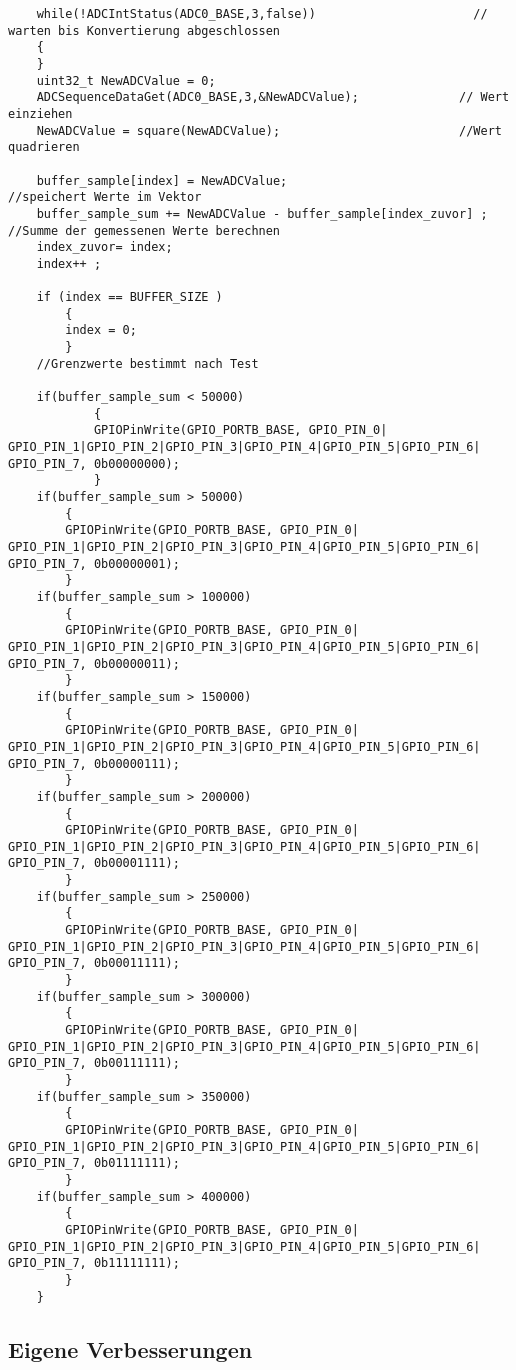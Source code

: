 \begin{lstlisting}
    while(!ADCIntStatus(ADC0_BASE,3,false))                      // warten bis Konvertierung abgeschlossen
    {
    }
    uint32_t NewADCValue = 0;
    ADCSequenceDataGet(ADC0_BASE,3,&NewADCValue);              // Wert einziehen
    NewADCValue = square(NewADCValue);                         //Wert quadrieren

    buffer_sample[index] = NewADCValue;                                 //speichert Werte im Vektor
    buffer_sample_sum += NewADCValue - buffer_sample[index_zuvor] ;     //Summe der gemessenen Werte berechnen
    index_zuvor= index;
    index++ ;

    if (index == BUFFER_SIZE )
        {
        index = 0;
        }
    //Grenzwerte bestimmt nach Test

    if(buffer_sample_sum < 50000)
            {
            GPIOPinWrite(GPIO_PORTB_BASE, GPIO_PIN_0| GPIO_PIN_1|GPIO_PIN_2|GPIO_PIN_3|GPIO_PIN_4|GPIO_PIN_5|GPIO_PIN_6| GPIO_PIN_7, 0b00000000);
            }
    if(buffer_sample_sum > 50000)
        {
        GPIOPinWrite(GPIO_PORTB_BASE, GPIO_PIN_0| GPIO_PIN_1|GPIO_PIN_2|GPIO_PIN_3|GPIO_PIN_4|GPIO_PIN_5|GPIO_PIN_6| GPIO_PIN_7, 0b00000001);
        }
    if(buffer_sample_sum > 100000)
        {
        GPIOPinWrite(GPIO_PORTB_BASE, GPIO_PIN_0| GPIO_PIN_1|GPIO_PIN_2|GPIO_PIN_3|GPIO_PIN_4|GPIO_PIN_5|GPIO_PIN_6| GPIO_PIN_7, 0b00000011);
        }
    if(buffer_sample_sum > 150000)
        {
        GPIOPinWrite(GPIO_PORTB_BASE, GPIO_PIN_0| GPIO_PIN_1|GPIO_PIN_2|GPIO_PIN_3|GPIO_PIN_4|GPIO_PIN_5|GPIO_PIN_6| GPIO_PIN_7, 0b00000111);
        }
    if(buffer_sample_sum > 200000)
        {
        GPIOPinWrite(GPIO_PORTB_BASE, GPIO_PIN_0| GPIO_PIN_1|GPIO_PIN_2|GPIO_PIN_3|GPIO_PIN_4|GPIO_PIN_5|GPIO_PIN_6| GPIO_PIN_7, 0b00001111);
        }
    if(buffer_sample_sum > 250000)
        {
        GPIOPinWrite(GPIO_PORTB_BASE, GPIO_PIN_0| GPIO_PIN_1|GPIO_PIN_2|GPIO_PIN_3|GPIO_PIN_4|GPIO_PIN_5|GPIO_PIN_6| GPIO_PIN_7, 0b00011111);
        }
    if(buffer_sample_sum > 300000)
        {
        GPIOPinWrite(GPIO_PORTB_BASE, GPIO_PIN_0| GPIO_PIN_1|GPIO_PIN_2|GPIO_PIN_3|GPIO_PIN_4|GPIO_PIN_5|GPIO_PIN_6| GPIO_PIN_7, 0b00111111);
        }
    if(buffer_sample_sum > 350000)
        {
        GPIOPinWrite(GPIO_PORTB_BASE, GPIO_PIN_0| GPIO_PIN_1|GPIO_PIN_2|GPIO_PIN_3|GPIO_PIN_4|GPIO_PIN_5|GPIO_PIN_6| GPIO_PIN_7, 0b01111111);
        }
    if(buffer_sample_sum > 400000)
        {
        GPIOPinWrite(GPIO_PORTB_BASE, GPIO_PIN_0| GPIO_PIN_1|GPIO_PIN_2|GPIO_PIN_3|GPIO_PIN_4|GPIO_PIN_5|GPIO_PIN_6| GPIO_PIN_7, 0b11111111);
        }
    }
\end{lstlisting}


\subsection{Eigene Verbesserungen}
